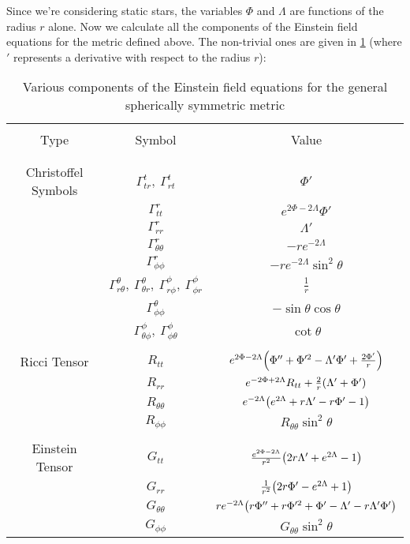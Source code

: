 \documentclass[a4paper,12pt,onehalfspacing]{report}
\begin{document}
Since we're considering static stars, the variables $\Phi$ and $\Lambda$ are functions of the radius $r$ alone. Now we calculate all the components of the Einstein field equations for the metric defined above. The non-trivial ones are given in \cref{table: symbols} (where $'$ represents a derivative with respect to the radius $r$): 

\begin{table}[ht!]
    \centering
    \begin{tabular}{ |c|c|c| }
    \hline
    &&\\[0.01ex]
    Type & Symbol & Value \\[0.01ex]
    &&\\[0.01ex]
    \hline\hline
    &&\\[1ex]
    Christoffel Symbols & $ \Gamma ^{t}_{tr},\  \Gamma ^{t}_{rt}$ & $\Phi '$  \\[1.5ex]
    & $\Gamma ^r_{tt}$ & $e^{2 \Phi-2 \Lambda} \Phi '$ \\[1.5ex]
    &$\Gamma ^r_{rr}$ & $\Lambda '$\\[1.5ex]
    &$\Gamma ^r_{\theta \theta}$ & $-re^{-2 \Lambda}$\\[1.5ex]
    &$\Gamma ^r_{\phi\phi}$ & $-re^{-2 \Lambda} \sin ^2\theta$\\[1.5ex]
    &$\Gamma ^{\theta}_{r\theta},\ \Gamma ^{\theta}_{\theta r},\ \Gamma ^{\phi }_{r\phi },\  \Gamma ^{\phi }_{\phi r}$ & $\frac{1}{r}$\\[1.5ex]
    &$\Gamma ^{\theta }_{\phi\phi }$& $-\sin \theta \cos \theta$\\[1.5ex]
    &$\Gamma ^{\phi }_{\theta\phi },\  \Gamma ^{\phi }_{\phi \theta}$ & $\cot \theta$\\[2ex]
    \hline
    &&\\[1ex]
    Ricci Tensor & $R_{tt}$ & $e^{2 \Phi-2 \Lambda} \qty(\Phi ''+\Phi '^2-  \Lambda '\Phi ' +\frac{2\Phi '}{r})$\\[3ex]
    & $R_{rr}$ & $e^{-2 \Phi+2 \Lambda}R_{tt}+ \frac{2}{r}\qty(\Lambda'+ \Phi ')$\\[3ex]
    &$R_{\theta \theta }$ & $e^{-2 \Lambda } \qty(e^{2 \Lambda }+r \Lambda'-r \Phi'-1)$\\[3ex]
    &$R_{\phi \phi }$ & $R_{\theta\theta }\sin ^2\theta$\\[2ex]
    \hline
    &&\\[1ex]
    Einstein Tensor &$G_{tt}$ & $\frac{e^{2 \Phi-2 \Lambda}}{r^2}\qty(2 r \Lambda '+e^{2 \Lambda}-1)$\\[3ex]
    &$G_{rr}$ & $\frac{1}{r^2}\qty(2 r \Phi '-{e^{2 \Lambda}+1})$\\[3ex]
    &$G_{\theta \theta }$ & $r e^{-2 \Lambda } \qty(r \Phi ''+r \Phi '^2 +\Phi'-\Lambda'-r \Lambda ' \Phi ')$\\[3ex]
    &$G_{\phi \phi }$ & $G_{\theta \theta }\sin ^2\theta$\\[2ex]
    \hline
    \end{tabular}
    \caption{Various components of the Einstein field equations for the general spherically symmetric metric}
    \label{table: symbols} %
\end{table}
\end{document}
